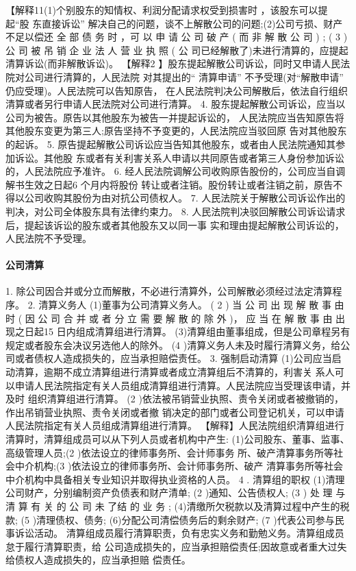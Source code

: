 \documentclass[UTF8,12pt]{ctexart}
\numberwithin{equation}{section} %
\numberwithin{figure}{section}
\numberwithin{table}{section}
\begin{document}
	【解释11(1)个别股东的知情权、利润分配请求权受到损害时 ，该股东可以提起“股 东直接诉讼” 解决自己的问题，谈不上解散公司的问题;(2)公司亏损、财产不足以偿还 全 部 债 务 时 ，可 以 申 请 公 司 破 产 ( 而 非 解 散 公 司 ) ; ( 3 ) 公 司 被 吊 销 企 业 法 人 营 业 执 照 ( 公 司已经解散了)未进行清算的，应提起清算诉讼(而非解散诉讼)。
	【解释2 】股东提起解散公司诉讼，同时又申请人民法院对公司进行清算的，人民法院 对其提出的“ 清算申请” 不予受理(对“解散申请” 仍应受理)。人民法院可以告知原告， 在人民法院判决公司解散后，依法自行组织清算或者另行申请人民法院对公司进行清算。
	4. 股东提起解散公司诉讼，应当以公司为被告。原告以其他股东为被告一并提起诉讼的， 人民法院应当告知原告将其他股东变更为第三人;原告坚持不予变更的，人民法院应当驳回原 告对其他股东的起诉。
	5. 原告提起解散公司诉讼应当告知其他股东，或者由人民法院通知其参加诉讼。其他股 东或者有关利害关系人申请以共同原告或者第三人身份参加诉讼的，人民法院应予准许。
	6. 经人民法院调解公司收购原告股份的，公司应当自调解书生效之日起6 个月内将股份 转让或者注销。股份转让或者注销之前，原告不得以公司收购其股份为由对抗公司债权人。
	7. 人民法院关于解散公司诉讼作出的判决，对公司全体股东具有法律约束力。
	8. 人民法院判决驳回解散公司诉讼请求后，提起该诉讼的股东或者其他股东又以同一事 实和理由提起解散公司诉讼的，人民法院不予受理。
	
	\paragraph{公司清算}
	1. 除公司因合并或分立而解散，不必进行清算外，公司解散必须经过法定清算程序。
	2. 清算义务人
	(1)董事为公司清算义务人。
	( 2 ) 当 公 司 出 现 解 散 事 由 时 ( 因 公 司 合 并 或 者 分 立 需 要 解 散 的 除 外 )， 应 当 在 解 散 事 由 出 现之日起15 日内组成清算组进行清算。 (3)清算组由董事组成，但是公司章程另有规定或者股东会决议另选他人的除外。
	(4 )清算义务人未及时履行清算义务，给公司或者债权人造成损失的，应当承担赔偿责任。 3. 强制启动清算 (1)公司应当启动清算，逾期不成立清算组进行清算或者成立清算组后不清算的，利害关 系人可以申请人民法院指定有关人员组成清算组进行清算。人民法院应当受理该申请，并及时 组织清算组进行清算。
	(2 )依法被吊销营业执照、责令关闭或者被撤销的，作出吊销营业执照、责令关闭或者撤 销决定的部门或者公司登记机关，可以申请人民法院指定有关人员组成清算组进行清算。
	【解释】人民法院组织清算组进行清算时，清算组成员可以从下列人员或者机构中产生: (1)公司股东、董事、监事、高级管理人员;(2 )依法设立的律师事务所、会计师事务 所、破产清算事务所等社会中介机构;(3 )依法设立的律师事务所、会计师事务所、破产 清算事务所等社会中介机构中具备相关专业知识并取得执业资格的人员。
	4 . 清算组的职权
	(1)清理公司财产，分别编制资产负债表和财产清单;
	(2 )通知、公告债权人;
	(3 ) 处 理 与 清 算 有 关 的 公 司 未 了结 的 业 务 ; (4)清缴所欠税款以及清算过程中产生的税款;
	(5 )清理债权、债务;
	(6)分配公司清偿债务后的剩余财产;
	(7 )代表公司参与民事诉讼活动。 清算组成员履行清算职责，负有忠实义务和勤勉义务。清算组成员怠于履行清算职责，给 公司造成损失的，应当承担赔偿责任;因故意或者重大过失给债权人造成损失的，应当承担赔 偿责任。
	
\end{document}
